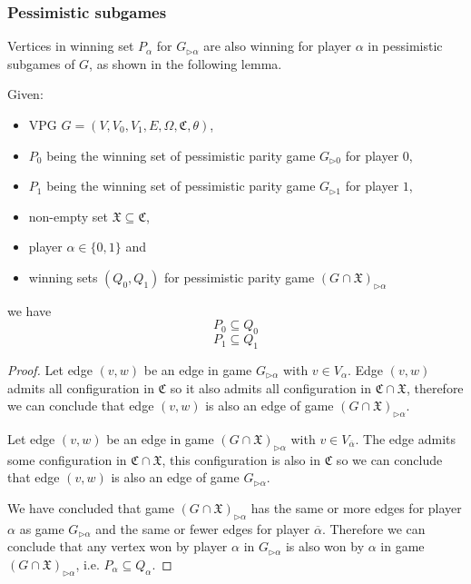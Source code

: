 \subsubsection{Pessimistic subgames}
Vertices in winning set $P_\alpha$ for $G_{\triangleright\alpha}$ are also winning for player $\alpha$ in pessimistic subgames of $G$, as shown in the following lemma.
\begin{lemma}
	\label{lem_pessimistic_subgames}
	Given:
	\begin{itemize}
		\item VPG $G = (V,V_0,V_1,E,\Omega, \mathfrak{C},\theta)$,
		\item $P_0$ being the winning set of pessimistic parity game $G_{\triangleright0}$ for player $0$,
		\item $P_1$ being the winning set of pessimistic parity game $G_{\triangleright1}$ for player $1$,
		\item non-empty set $\mathfrak{X} \subseteq \mathfrak{C}$,
		\item player $\alpha \in \{0,1\}$ and
		\item winning sets $(Q_0,Q_1)$ for pessimistic parity game $(G \cap \mathfrak{X})_{\triangleright\alpha}$
	\end{itemize}
	we have
	\[ P_0 \subseteq Q_0 \]
	\[ P_1 \subseteq Q_1 \]
	\begin{proof}
		
		Let edge $(v,w)$ be an edge in game $G_{\triangleright\alpha}$ with $v \in V_\alpha$. Edge $(v,w)$ admits all configuration in $\mathfrak{C}$ so it also admits all configuration in $\mathfrak{C} \cap \mathfrak{X}$, therefore we can conclude that edge $(v,w)$ is also an edge of game $(G\cap \mathfrak{X})_{\triangleright\alpha}$.
		
		Let edge $(v,w)$ be an edge in game $(G \cap \mathfrak{X})_{\triangleright\alpha}$ with $v \in V_{\overline{\alpha}}$. The edge admits some configuration in $\mathfrak{C} \cap \mathfrak{X}$, this configuration is also in $\mathfrak{C}$ so we can conclude that edge $(v,w)$ is also an edge of game $G_{\triangleright\alpha}$.
		
		We have concluded that game $(G \cap \mathfrak{X})_{\triangleright\alpha}$ has the same or more edges for player $\alpha$ as game $G_{\triangleright\alpha}$ and the same or fewer edges for player $\overline{\alpha}$. Therefore we can conclude that any vertex won by player $\alpha$ in $G_{\triangleright\alpha}$ is also won by $\alpha$ in game $(G \cap \mathfrak{X})_{\triangleright\alpha}$, i.e. $P_\alpha \subseteq Q_\alpha$.
		

\end{proof}
\end{lemma}
